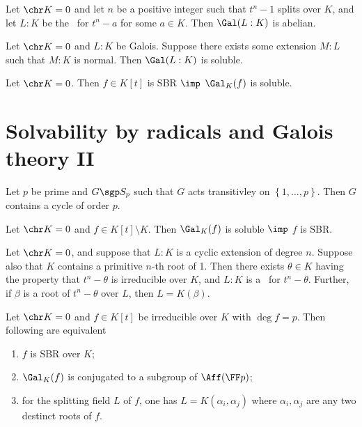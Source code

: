 \documentclass{article}
\begin{document}
\begin{tlemma}
  Let \( \chr K = 0 \) and let \( n \) be a positive integer such that \( t^n-1 \) splits over \( K \), and let \( L:K \) be the \sfe~for \( t^{n}-a \) for some \( a\in K \).
  Then \( \Gal(L:K) \) is abelian.
\end{tlemma}

\begin{ttheorem}
  Let \( \chr K = 0 \) and \( L:K \) be Galois.
  Suppose there exists some extension \( M:L \) such that \( M:K \) is normal.
  Then \( \Gal(L:K) \) is soluble.
\end{ttheorem}

\begin{tcorollary}
  Let \( \chr K = 0 \).
  Then \( f\in K[t] \) is SBR \( \imp \) \( \Gal_K(f) \) is soluble.
\end{tcorollary}
\section{Solvability by radicals and Galois theory II}
\begin{tlemma}
  Let \( p \) be prime and \( G\sgp S_p \) such that \( G \) acts transitivley on \( \left\{ 1,\dots,p \right\} \).
  Then \( G \) contains a cycle of order \( p \).
\end{tlemma}

\begin{ttheorem}
  Let \( \chr K = 0 \) and \( f\in K[t]\setminus K \).
  Then \( \Gal_K(f) \) is soluble \( \imp \) \( f \) is SBR.
\end{ttheorem}

\begin{tlemma}[Wooley 14.8]
  Let \( \chr K = 0 \), and suppose that \( L:K \) is a cyclic extension of degree \( n \).
  Suppose also that \( K \) contains a primitive \( n \)-th root of 1.
  Then there exists \( \theta \in K \) having the property that \( t^n -\theta \) is irreducible over \( K \), and \( L:K \) is a \sf~for \( t^n-\theta \).
  Further, if \( \beta \) is a root of \( t^n-\theta \) over \( L \), then \( L=K(\beta) \).
\end{tlemma}

\begin{ttheorem}
  Let \( \chr K = 0 \) and \( f\in K[t] \) be irreducible over \( K \) with \( \deg f = p \).
  Then following are equivalent
  \begin{enumerate}
    \item \( f \) is SBR over \( K \);
    \item \( \Gal_K(f) \) is conjugated to a subgroup of \( \Aff(\FF p) \);
    \item for the splitting field \( L \) of \( f \), one has \( L = K(\alpha_i,\alpha_j) \) where \( \alpha_i,\alpha_j \) are any two destinct roots of \( f \).
  \end{enumerate}
\end{ttheorem}
\end{document}

